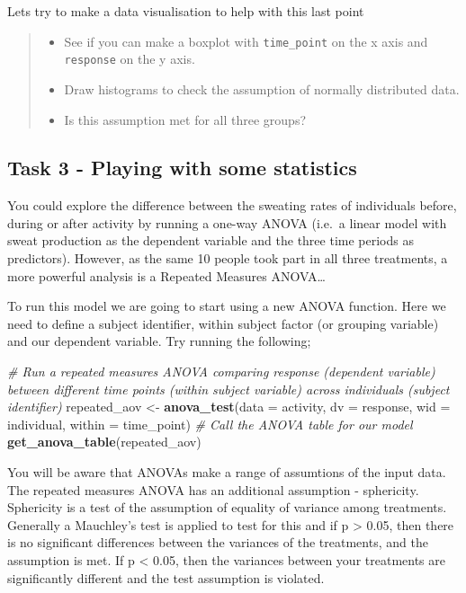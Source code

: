 \documentclass[
]{book}
\newenvironment{Shaded}{\begin{snugshade}}{\end{snugshade}}
\newcommand{\AttributeTok}[1]{\textcolor[rgb]{0.13,0.29,0.53}{#1}}
\newcommand{\CommentTok}[1]{\textcolor[rgb]{0.56,0.35,0.01}{\textit{#1}}}
\newcommand{\FunctionTok}[1]{\textcolor[rgb]{0.13,0.29,0.53}{\textbf{#1}}}
\newcommand{\NormalTok}[1]{#1}
\newcommand{\OtherTok}[1]{\textcolor[rgb]{0.56,0.35,0.01}{#1}}
\providecommand{\tightlist}{%
  \setlength{\itemsep}{0pt}\setlength{\parskip}{0pt}}
\begin{document}
Lets try to make a data visualisation to help with this last point

\begin{quote}
\begin{itemize}
\tightlist
\item
  See if you can make a boxplot with \texttt{time\_point} on the x axis and \texttt{response} on the y axis.
\item
  Draw histograms to check the assumption of normally distributed data.
\item
  Is this assumption met for all three groups?
\end{itemize}
\end{quote}

\hypertarget{task-3---playing-with-some-statistics}{%
\subsection{Task 3 - Playing with some statistics}\label{task-3---playing-with-some-statistics}}

You could explore the difference between the sweating rates of individuals before, during or after activity by running a one-way ANOVA (i.e.~a linear model with sweat production as the dependent variable and the three time periods as predictors). However, as the same 10 people took part in all three treatments, a more powerful analysis is a Repeated Measures ANOVA\ldots{}

To run this model we are going to start using a new ANOVA function. Here we need to define a subject identifier, within subject factor (or grouping variable) and our dependent variable. Try running the following;

\begin{Shaded}
\begin{Highlighting}[]
\CommentTok{\# Run a repeated measures ANOVA comparing response (dependent variable) between different time points (within subject variable) across individuals (subject identifier)}
\NormalTok{repeated\_aov }\OtherTok{\textless{}{-}} \FunctionTok{anova\_test}\NormalTok{(}\AttributeTok{data =}\NormalTok{ activity, }\AttributeTok{dv =}\NormalTok{ response, }\AttributeTok{wid =}\NormalTok{ individual, }\AttributeTok{within =}\NormalTok{ time\_point)}
\CommentTok{\# Call the ANOVA table for our model}
\FunctionTok{get\_anova\_table}\NormalTok{(repeated\_aov)}
\end{Highlighting}
\end{Shaded}

You will be aware that ANOVAs make a range of assumtions of the input data. The repeated measures ANOVA has an additional assumption - sphericity. Sphericity is a test of the assumption of equality of variance among treatments. Generally a Mauchley's test is applied to test for this and if p \textgreater{} 0.05, then there is no significant differences between the variances of the treatments, and the assumption is met. If p \textless{} 0.05, then the variances between your treatments are significantly different and the test assumption is violated.
\end{document}
